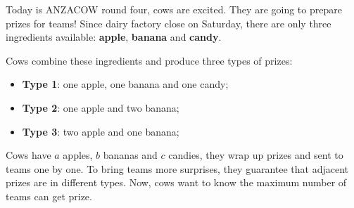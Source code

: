 Today is ANZACOW round four, cows are excited. They are going to prepare prizes for teams!
Since dairy factory close on Saturday, there are only three ingredients available:
\textbf{apple}, \textbf{banana} and \textbf{candy}. 

Cows combine these ingredients and produce three types of prizes:
\begin{itemize}
  \item \textbf{Type 1}: one apple, one banana and one candy;
  \item \textbf{Type 2}: one apple and two banana;
  \item \textbf{Type 3}: two apple and one banana;
\end{itemize}

Cows have $a$ apples, $b$ bananas and $c$ candies, they wrap up prizes and sent to teams
one by one. To bring teams more surprises, they guarantee that adjacent prizes are in different
types. Now, cows want to know the maximum number of teams can get prize.

